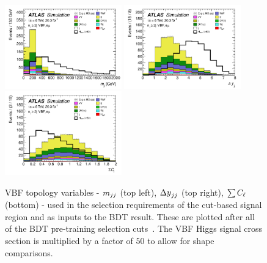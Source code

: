 \begin{figure}[h!]
  \centering
  \captionsetup{justification=centering}
  \includegraphics[width=0.45\textwidth]{figures/BDT_mjj}
  \includegraphics[width=0.45\textwidth]{figures/BDT_dyjj}
  \includegraphics[width=0.45\textwidth]{figures/BDT_olv}
  \caption{VBF topology variables - $m_{jj}$ (top left), $\dyjj$ (top right), $\sum C_{\ell}$ (bottom) - used in the selection requirements of the cut-based signal region and as inputs to the BDT result. These are plotted after all of the BDT pre-training selection cuts~\cite{WW2015}. The VBF Higgs signal cross section is multiplied by a factor of $50$ to allow for shape comparisons.}
  \label{fig:vbf_bdt_vbftopo}
\end{figure}




